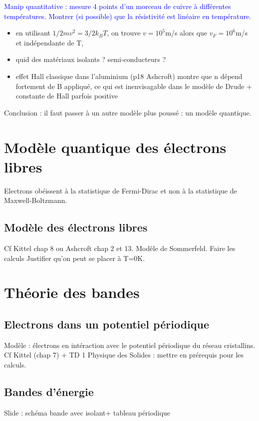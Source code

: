 \textcolor{blue}{Manip quantitative : mesure 4 points d'un morceau de cuivre à différentes températures. Montrer (si possible) que la résistivité est linéaire en température.}\\
\begin{itemize}
    \item en utilisant $1/2mv^2=3/2k_BT$, on trouve $v=10^5$m/s alors que $v_{F}=10^6$m/s et indépendante de T,
    \item quid des matériaux isolants ? semi-conducteurs ?
    \item effet Hall classique dans l'aluminium (p18 Ashcroft) montre que n dépend fortement de B appliqué, ce qui est inenvisagable dans le modèle de Drude + constante de Hall parfois positive
\end{itemize}

Conclusion : il faut passer à un autre modèle plus poussé : un modèle quantique.

\section{Modèle quantique des électrons libres}
Electrons obéissent à la statistique de Fermi-Dirac et non à la statistique de Maxwell-Boltzmann.
\subsection{Modèle des électrons libres}
Cf Kittel chap 8 ou Ashcroft chap 2 et 13. Modèle de Sommerfeld. Faire les calculs Justifier qu'on peut se placer à T=0K.

\section{Théorie des bandes}

\subsection{Electrons dans un potentiel périodique}
Modèle : électrons en intéraction avec le potentiel périodique du réseau cristallins.\\
Cf Kittel (chap 7) + TD 1 Physique des Solides : mettre en prérequis pour les calculs.

\subsection{Bandes d'énergie}
Slide : schéma bande avec isolant+ tableau périodique 

